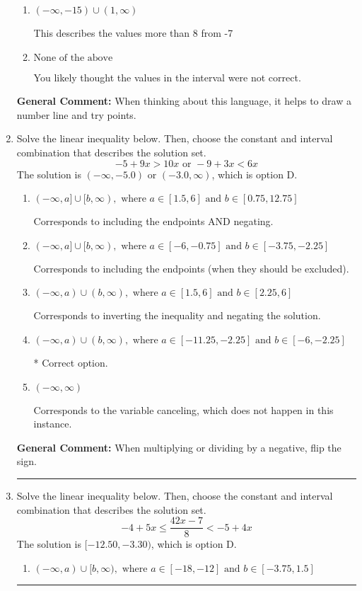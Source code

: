 \documentclass{extbook}[14pt]
\newcommand{\litem}[1]{\item #1

\rule{\textwidth}{0.4pt}}
\begin{document}
\begin{enumerate}
{\begin{enumerate}[label=\Alph*.]
This describes the values no less than 8 from -7
\item \( (-\infty, -15) \cup (1, \infty) \)

This describes the values more than 8 from -7
\item \( \text{None of the above} \)

You likely thought the values in the interval were not correct.
\end{enumerate}

\textbf{General Comment:} When thinking about this language, it helps to draw a number line and try points.
}
\litem{
Solve the linear inequality below. Then, choose the constant and interval combination that describes the solution set.
\[ -5 + 9 x > 10 x \text{ or } -9 + 3 x < 6 x \]The solution is \( (-\infty, -5.0) \text{ or } (-3.0, \infty) \), which is option D.\begin{enumerate}[label=\Alph*.]
\item \( (-\infty, a] \cup [b, \infty), \text{ where } a \in [1.5, 6] \text{ and } b \in [0.75, 12.75] \)

Corresponds to including the endpoints AND negating.
\item \( (-\infty, a] \cup [b, \infty), \text{ where } a \in [-6, -0.75] \text{ and } b \in [-3.75, -2.25] \)

Corresponds to including the endpoints (when they should be excluded).
\item \( (-\infty, a) \cup (b, \infty), \text{ where } a \in [1.5, 6] \text{ and } b \in [2.25, 6] \)

Corresponds to inverting the inequality and negating the solution.
\item \( (-\infty, a) \cup (b, \infty), \text{ where } a \in [-11.25, -2.25] \text{ and } b \in [-6, -2.25] \)

 * Correct option.
\item \( (-\infty, \infty) \)

Corresponds to the variable canceling, which does not happen in this instance.
\end{enumerate}

\textbf{General Comment:} When multiplying or dividing by a negative, flip the sign.
}
\litem{
Solve the linear inequality below. Then, choose the constant and interval combination that describes the solution set.
\[ -4 + 5 x \leq \frac{42 x - 7}{8} < -5 + 4 x \]The solution is \( [-12.50, -3.30) \), which is option D.\begin{enumerate}[label=\Alph*.]
\item \( (-\infty, a) \cup [b, \infty), \text{ where } a \in [-18, -12] \text{ and } b \in [-3.75, 1.5] \)


\end{enumerate}}
\end{enumerate}
\end{document}
